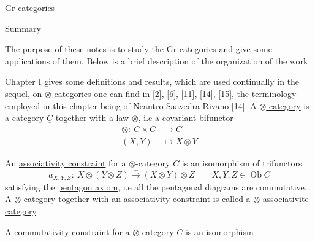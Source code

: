 
Gr-categories

Summary

The purpose of these notes is to study the Gr-categories and give some applications of them. Below is a brief description of the organization of the work.

Chapter I gives some definitions and results, which are used continually in the sequel, on $\otimes$-categories one can find in [2], [6], [11], [14], [15], the terminology employed in this chapter being of Neantro Saavedra Rivano [14]. A \uline{$\otimes$-category} is a category $\underline C$ together with a \uline{law $\otimes$}, i.e a covariant bifunctor
\[
\begin{aligned}
\otimes:\ \underline C\times\underline C&\longrightarrow\underline C\\
(X,Y)&\longmapsto X\otimes Y
\end{aligned}
\]

An \uline{associativity constraint} for a $\otimes$-category $\underline C$ is an isomorphism of trifunctors
\[
a_{X,Y,Z}:\ X\otimes(Y\otimes Z)\xrightarrow{\sim}(X\otimes Y)\otimes Z
\qquad X,Y,Z\in\operatorname{Ob}\underline C
\]
satisfying the \uline{pentagon axiom}, i.e all the pentagonal diagrams
are commutative. A $\otimes$-category together with an associativity constraint is called a \uline{$\otimes$-associativite category}.

A \uline{commutativity constraint} for a $\otimes$-category $\underline C$ is an isomorphism
